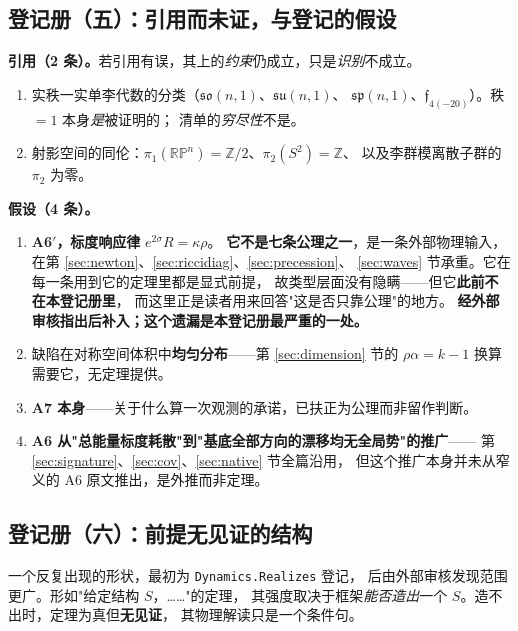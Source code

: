 \documentclass[11pt,a4paper]{article}
\theoremstyle{sudef}
\begin{document}
\subsection{登记册（五）：引用而未证，与登记的假设}\label{ss:cited}

\textbf{引用（2 条）。}若引用有误，其上的\emph{约束}仍成立，只是\emph{识别}不成立。
\begin{enumerate}[leftmargin=1.8em,itemsep=2pt]
\item 实秩一实单李代数的分类（$\mathfrak{so}(n,1)$、$\mathfrak{su}(n,1)$、
      $\mathfrak{sp}(n,1)$、$\mathfrak f_{4(-20)}$）。秩 $=1$ 本身\emph{是}被证明的；
      清单的\emph{穷尽性}不是。
\item 射影空间的同伦：$\pi_1(\mathbb{RP}^n)=\mathbb Z/2$、$\pi_2(S^2)=\mathbb Z$、
      以及李群模离散子群的 $\pi_2$ 为零。
\end{enumerate}

\textbf{假设（4 条）。}
\begin{enumerate}[leftmargin=1.8em,itemsep=2pt]
\item \textbf{A6$'$，标度响应律} $e^{2\sigma}R=\kappa\rho$。
      \textbf{它不是七条公理之一}，是一条外部物理输入，
      在第 \ref{sec:newton}、\ref{sec:riccidiag}、\ref{sec:precession}、
      \ref{sec:waves} 节承重。它在每一条用到它的定理里都是显式前提，
      故类型层面没有隐瞒——但它\textbf{此前不在本登记册里}，
      而这里正是读者用来回答"这是否只靠公理"的地方。
      \textbf{经外部审核指出后补入；这个遗漏是本登记册最严重的一处。}
\item 缺陷在对称空间体积中\textbf{均匀分布}——第 \ref{sec:dimension} 节的
      $\rho\alpha=k-1$ 换算需要它，无定理提供。
\item \textbf{A7 本身}——关于什么算一次观测的承诺，已扶正为公理而非留作判断。
\item \textbf{A6 从"总能量标度耗散"到"基底全部方向的漂移均无全局势"的推广}——
      第 \ref{sec:signature}、\ref{sec:cov}、\ref{sec:native} 节全篇沿用，
      但这个推广本身并未从窄义的 A6 原文推出，是外推而非定理。
\end{enumerate}

\subsection{登记册（六）：前提无见证的结构}\label{ss:unwitnessed}

一个反复出现的形状，最初为 \texttt{Dynamics.Realizes} 登记，
后由外部审核发现范围更广。形如"给定结构 $S$，……"的定理，
其强度取决于框架\emph{能否造出}一个 $S$。造不出时，定理为真但\textbf{无见证}，
其物理解读只是一个条件句。
\end{document}

